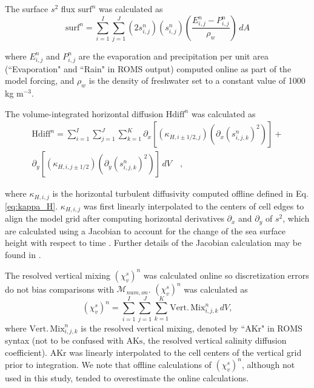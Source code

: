 The surface $s^2$ flux $\mathrm{surf}^n$ was calculated as
\begin{equation} \label{eq:append_surf}
        \mathrm{surf}^n = \sum_{i=1}^{I}\sum_{j=1}^{J}(2s_{i,j}^n)(s_{i,j}^n) \left(\frac{E_{i,j}^n-P_{i,j}^n}{\rho_w} \right) \, dA
\end{equation}

where $E_{i,j}^n$ and $P_{i,j}^n$ are the evaporation and precipitation per unit area (``Evaporation" and ``Rain" in ROMS output) computed online as part of the model forcing, and $\rho_w$ is the density of freshwater set to a constant value of 1000 kg m$^{-3}$. 

The volume-integrated horizontal diffusion $\mathrm{Hdiff}^n$ was calculated as
\begin{equation}
    \begin{split} \label{eq:append_hdiff}
            \mathrm{Hdiff}^n = \sum_{i=1}^{I}\sum_{j=1}^{J}\sum_{k=1}^{K} \partial_x \left[ \left(\kappa_{H,i \pm 1/2,j} \right) \left(\partial_x \left(s_{i,j,k}^{n} \right)^2 \right) \right] + \\ \partial_y \left[\left(\kappa_{H,i,j \pm 1/2} \right) \left(\partial_y \left(s_{i,j,k}^{n} \right)^2 \right) \right] \, dV \quad ,
    \end{split}
\end{equation}

where $\kappa_{H,i,j}$ is the horizontal turbulent diffusivity computed offline defined in Eq. \ref{eq:kappa_H}. $\kappa_{H,i,j}$ was first linearly interpolated to the centers of cell edges to align the model grid after computing horizontal derivatives $\partial_x$ and $\partial_y$ of $s^2$, which are calculated using a Jacobian to account for the change of the sea surface height with respect to time \citep{shchepetkin2005regional}. Further details of the Jacobian calculation may be found in \citet{xroms}. 

The resolved vertical mixing $(\chi_v^s)^n$ was calculated online so discretization errors do not bias comparisons with $\mathcal{M}_{num, on}$. $(\chi_v^s)^n$ was calculated as 
\begin{equation} \label{eq:append_vmix}
        (\chi_v^s)^n = \sum_{i=1}^{I}\sum_{j=1}^{J}\sum_{k=1}^{K} \mathrm{Vert. \, Mix}_{i,j,k}^n \, dV,
\end{equation}
where $\mathrm{Vert. \, Mix}_{i,j,k}^n$ is the resolved vertical mixing, denoted by ``$\mathrm{AKr}$" in ROMS syntax (not to be confused with $\mathrm{AKs}$, the resolved vertical salinity diffusion coefficient). $\mathrm{AKr}$ was linearly interpolated to the cell centers of the vertical grid prior to integration. We note that offline calculations of $(\chi_v^s)^n$, although not used in this study, tended to overestimate the online calculations.

